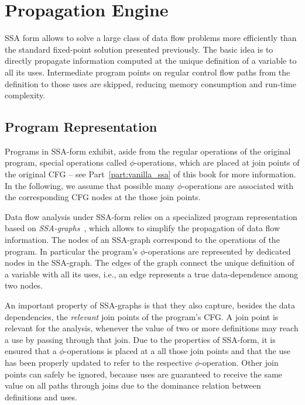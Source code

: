 \section{Propagation Engine}
\label{novillo:sec:prop-engine} 

SSA form allows to solve a large class of data flow problems more efficiently
than the standard fixed-point solution presented previously. The basic idea is
to directly propagate information computed at the unique definition of a
variable to all its uses. Intermediate program points on regular control flow
paths from the definition to those uses are skipped, reducing memory consumption
and run-time complexity.

\subsection{Program Representation}

Programs in SSA-form exhibit, aside from the regular operations of the original
program, special operations called $\phi$-operations, which are placed at join
points of the original CFG -- see Part~\ref{part:vanilla_ssa} of this book for
more information. In the following, we assume that possible many
$\phi$-operations are associated with the corresponding CFG nodes at the those
join points.

Data flow analysis under SSA-form relies on a specialized program
representation based on \emph{SSA-graphs}~\cite{novillo:bib:CFRWZ91}, which
allows to simplify the propagation of data flow information. The nodes of an
SSA-graph correspond to the operations of the program. In particular the
program's $\phi$-operations are represented by dedicated nodes in the SSA-graph.
The edges of the graph connect the unique definition of a variable with all its
uses, i.e., an edge represents a true data-dependence among two nodes.

An important property of SSA-graphs is that they also capture, besides the data
dependencies, the \emph{relevant} join points of the program's CFG. A join point
is relevant for the analysis, whenever the value of two or more definitions may
reach a use by passing through that join. Due to the properties of SSA-form, it
is ensured that a $\phi$-operations is placed at a all those join points and
that the use has been properly updated to refer to the respective
$\phi$-operation. Other join points can safely be ignored, because uses are
guaranteed to receive the same value on all paths through joins due to the
dominance relation between definitions and uses.


